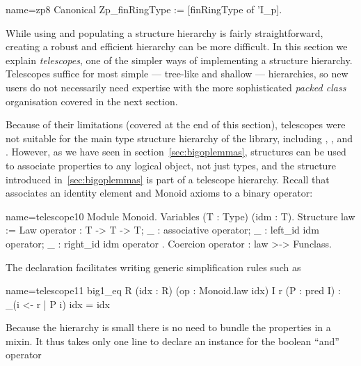 \begin{coq}{name=zp8}{}
Canonical Zp_finRingType := [finRingType of 'I_p].
\end{coq}



While using and populating a structure hierarchy is fairly
straightforward, creating a robust and efficient hierarchy can be more
difficult. In this section we explain \emph{telescopes}, one of the
simpler ways of implementing a structure hierarchy.  Telescopes
suffice for most simple --- tree-like and shallow --- hierarchies, so
new users do not necessarily need expertise with the more
sophisticated \emph{packed class} organisation covered in the next
section.

Because of their limitations (covered at the end of this section),
telescopes were not suitable for the main type structure hierarchy
of the \mcbMC{} library, including , , 
and . However, as we have seen in
section~\ref{sec:bigoplemmas}, structures can be used to associate
properties to any logical object, not just types, and the
 structure introduced in~\ref{sec:bigoplemmas} is part
of a telescope hierarchy. Recall that  associates an
identity element and Monoid axioms to a binary operator:

\begin{coq}{name=telescope10}{}
Module Monoid.
Variables (T : Type) (idm : T).
Structure law := Law {
  operator : T -> T -> T;
  _ : associative operator;
  _ : left_id idm operator;
  _ : right_id idm operator
}.
Coercion operator : law >-> Funclass.
\end{coq}

The  declaration facilitates writing generic 
simplification rules such as

\begin{coq}{name=telescope11}{}
  big1_eq R (idx : R) (op : Monoid.law idx) I r (P : pred I) :
    \big[op/idx]_(i <- r | P i) idx = idx
\end{coq}

Because the  hierarchy is small there is no need to bundle
the  properties in a mixin. It thus takes only one line
to declare an instance for the boolean ``and'' operator 

